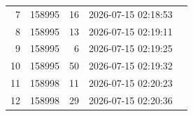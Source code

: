 \begin{center}
\begin{minipage}[t]{0.49\linewidth}
{\begin{tabular}{@{}rrrll@{}}
7 & 158995 & 16 & 2026-07-15 02:18:53 & \\
8 & 158995 & 13 & 2026-07-15 02:19:11 & \\
9 & 158995 & 6 & 2026-07-15 02:19:25 & \\
10 & 158995 & 50 & 2026-07-15 02:19:32 & \\
11 & 158998 & 11 & 2026-07-15 02:20:23 & \\
12 & 158998 & 29 & 2026-07-15 02:20:36 & \\
\bottomrule
\end{tabular}}
\par\vspace{10pt}
\label{tab:motivating-cats}
\end{minipage}
\end{center}

